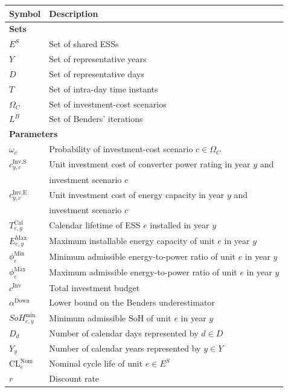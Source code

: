 \documentclass[preprint,12pt]{elsarticle}
\begin{document}
\begin{table}[htbp!]
    \centering
    \begin{tabular}{l l}
        \toprule
        \textbf{Symbol} & \textbf{Description} \\
        \midrule    
        \multicolumn{2}{l}{\textbf{Sets}}\\
        $E^S$       & Set of shared ESSs \\
        $Y$         & Set of representative years \\
        $D$         & Set of representative days \\
        $T$         & Set of intra-day time instants \\
        $\Omega_C$  & Set of investment-cost scenarios \\     
        $L^B$       & Set of Benders' iterations\\
        \midrule
        \multicolumn{2}{l}{\textbf{Parameters}}\\
        $\omega_c$ & Probability of investment-cost scenario $c \in \Omega_C$ \\
        $c^{\text{Inv,S}}_{y,c}$ & Unit investment cost of converter power rating in year $y$ and \\
        ~                        & investment scenario $c$\\
        $c^{\text{Inv,E}}_{y,c}$ & Unit investment cost of energy capacity in year $y$ and \\
        ~                        & investment scenario $c$\\        
        $T^\text{Cal}_{e,y}$ & Calendar lifetime of ESS $e$ installed in year $y$ \\
        $E^{\text{Max}}_{e,y}$ & Maximum installable energy capacity of unit $e$ in year $y$ \\
        $\phi^{\text{Min}}_e$ & Minimum admissible energy-to-power ratio of unit $e$ in year $y$ \\
        $\phi^{\text{Max}}_e$ & Maximum admissible energy-to-power ratio of unit $e$ in year $y$ \\
        $c^{\text{Inv}}$ & Total investment budget \\
        $\alpha^{\text{Down}}$ & Lower bound on the Benders underestimator \\
        $SoH_{e,y}^{\text{min}}$ & Minimum admissible SoH of unit $e$ in year $y$ \\
        $D_d$ & Number of calendar days represented by $d \in D$ \\
        $Y_y$ & Number of calendar years represented by $y \in Y$ \\
        $\mathrm{CL}^\text{Nom}_e$ & Nominal cycle life of unit $e \in E^S$\\
        $r$   & Discount rate\\      
        \bottomrule
    \end{tabular}
\end{table}
\end{document}
